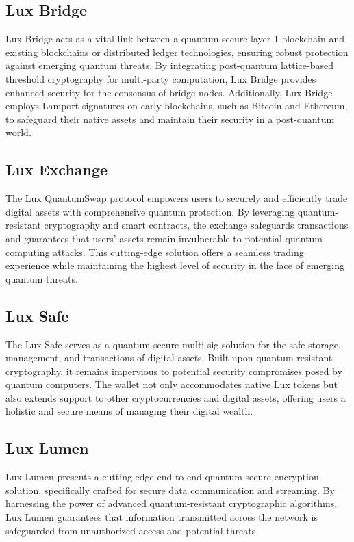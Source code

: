 \documentclass[11pt]{article}
\begin{document}
\subsection{Lux Bridge}

Lux Bridge acts as a vital link between a quantum-secure layer 1 blockchain and existing blockchains or distributed ledger technologies, ensuring robust protection against emerging quantum threats. By integrating post-quantum lattice-based threshold cryptography for multi-party computation, Lux Bridge provides enhanced security for the consensus of bridge nodes. Additionally, Lux Bridge employs Lamport signatures on early blockchains, such as Bitcoin and Ethereum, to safeguard their native assets and maintain their security in a post-quantum world.


\subsection{Lux Exchange}

The Lux QuantumSwap protocol empowers users to securely and efficiently trade digital assets with comprehensive quantum protection. By leveraging quantum-resistant cryptography and smart contracts, the exchange safeguards transactions and guarantees that users' assets remain invulnerable to potential quantum computing attacks. This cutting-edge solution offers a seamless trading experience while maintaining the highest level of security in the face of emerging quantum threats.


\subsection{Lux Safe}

The Lux Safe serves as a quantum-secure multi-sig solution for the safe storage, management, and transactions of digital assets. Built upon quantum-resistant cryptography, it remains impervious to potential security compromises posed by quantum computers. The wallet not only accommodates native Lux tokens but also extends support to other cryptocurrencies and digital assets, offering users a holistic and secure means of managing their digital wealth.


\subsection{Lux Lumen}

Lux Lumen presents a cutting-edge end-to-end quantum-secure encryption solution, specifically crafted for secure data communication and streaming. By harnessing the power of advanced quantum-resistant cryptographic algorithms, Lux Lumen guarantees that information transmitted across the network is safeguarded from unauthorized access and potential threats.
\end{document}
